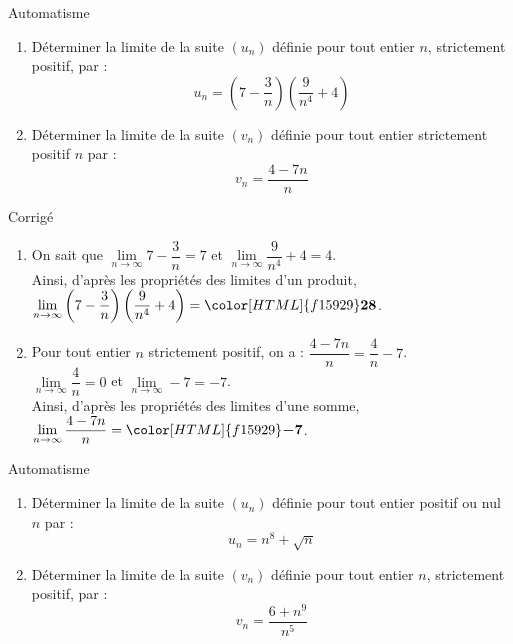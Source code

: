 \documentclass[a4paper,11pt,exos]{nsi} %
\newcounter{autNum}
\newcommand{\aut}[1]
{
	\addtocounter{autNum}{1}
	{\titlefont\color{UGLiBlue}\Large Automatisme\ \theautNum\ \normalsize{#1}}\smallskip	
}
\newcounter{corNum}
\newcommand{\cor}[1]
{
	\addtocounter{corNum}{1}
	{\titlefont\color{UGLiOrange}\Large Corrigé\ \thecorNum\ \normalsize{#1}}\smallskip	
}
\begin{document}
\aut{}
\begin{enumerate}
		\item Déterminer la limite de la suite $(u_n)$ définie pour tout entier $n$, strictement positif, par : $$u_n=\left(7-\dfrac{3}{n}\right)\left(\dfrac{9}{n^4}+4\right)$$
		\item Déterminer la limite de la suite $(v_n)$ définie pour tout entier strictement positif $n$ par : $$v_n=\dfrac{4-7n}{n}$$
\end{enumerate}

\cor{}
\begin{enumerate}
     \item On sait que $\lim\limits_{n\to\infty} 7-\dfrac{3}{n}=7$ et $\lim\limits_{n\to\infty} \dfrac{9}{n^4}+4=4$.\\Ainsi, d'après les propriétés des limites d'un produit, $\lim\limits_{n\to\infty} \left(7-\dfrac{3}{n}\right)\left(\dfrac{9}{n^4}+4\right)={\color[HTML]{f15929}\boldsymbol{28}}$.
     
     \item Pour tout entier $n$ strictement positif, on a : $\dfrac{4-7n}{n}=\dfrac{4}{n}-7$.\\$\lim\limits_{n\to\infty} \dfrac{4}{n}=0$ et $\lim\limits_{n\to\infty} -7=-7$.\\Ainsi, d'après les propriétés des limites d'une somme, $\lim\limits_{n\to\infty} \dfrac{4-7n}{n}={\color[HTML]{f15929}\boldsymbol{-7}}$.
\end{enumerate}

\aut{}
\begin{enumerate}
	\item Déterminer la limite de la suite $(u_n)$ définie pour tout entier positif ou nul $n$ par : $$u_n=n^{8}+\sqrt{n}$$
    \item Déterminer la limite de la suite $(v_n)$ définie pour tout entier $n$, strictement positif, par : $$v_n=\dfrac{6+n^9}{n^5}$$
\end{enumerate}
\end{document}
